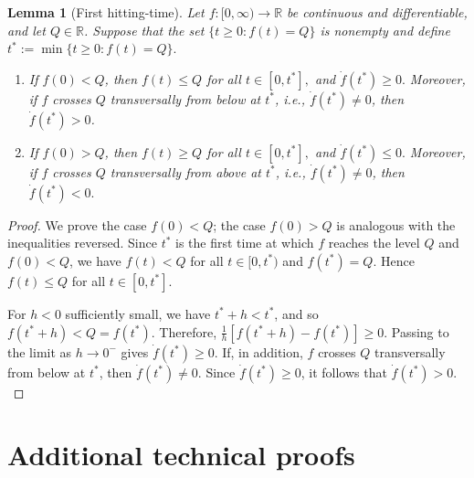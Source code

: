 \documentclass{article}
\newtheorem{lemma}{Lemma}
\begin{document}
\begin{lemma}[First hitting-time]\label{lem:first_hitting}
Let $f:[0,\infty)\to\mathbb{R}$ be continuous and differentiable, and let
$Q\in\mathbb{R}$. Suppose that the set $\{t\ge 0:f(t)=Q\}$ is nonempty and define $t^\ast:=\min\{t\ge 0:f(t)=Q\}.$
\begin{enumerate}
    \item If $f(0)<Q$, then $f(t)\le Q$ for all $t\in[0,t^\ast],$ and $\dot f(t^\ast)\ge 0.$
    Moreover, if $f$ crosses $Q$ transversally from below at $t^\ast$, i.e., $\dot f(t^\ast)\neq 0$, then $\dot f(t^\ast)>0$.
    
    \item If $f(0)>Q$, then $f(t)\ge Q$ for all $t\in[0,t^\ast],$ and $\dot f(t^\ast)\le 0.$
    Moreover, if $f$ crosses $Q$ transversally from above at $t^\ast$, i.e., $\dot f(t^\ast)\neq 0$, then $\dot f(t^\ast)<0.$
\end{enumerate}
\end{lemma}

\begin{proof}
We prove the case $f(0)<Q$; the case $f(0)>Q$ is analogous with the inequalities reversed.
Since $t^\ast$ is the first time at which $f$ reaches the level $Q$ and
$f(0)<Q$, we have $f(t)<Q$ for all $t\in[0,t^\ast)$ and $f(t^\ast)=Q.$
Hence $f(t)\le Q$ for all $t\in[0,t^\ast]$.

For $h<0$ sufficiently small, we have $t^\ast+h<t^\ast$, and so $ f(t^\ast+h)<Q=f(t^\ast).$
Therefore, $\frac{1}{h}[f(t^\ast+h)-f(t^\ast)] \ge 0$. Passing to the limit as $h\to 0^-$ gives $\dot f(t^\ast)\ge 0.$
If, in addition, $f$ crosses $Q$ transversally from below at $t^\ast$, then
$\dot f(t^\ast)\neq 0$. Since $\dot f(t^\ast)\ge 0$, it follows that $\dot f(t^\ast)>0.$
\end{proof}

\section{Additional technical proofs}
\end{document}
